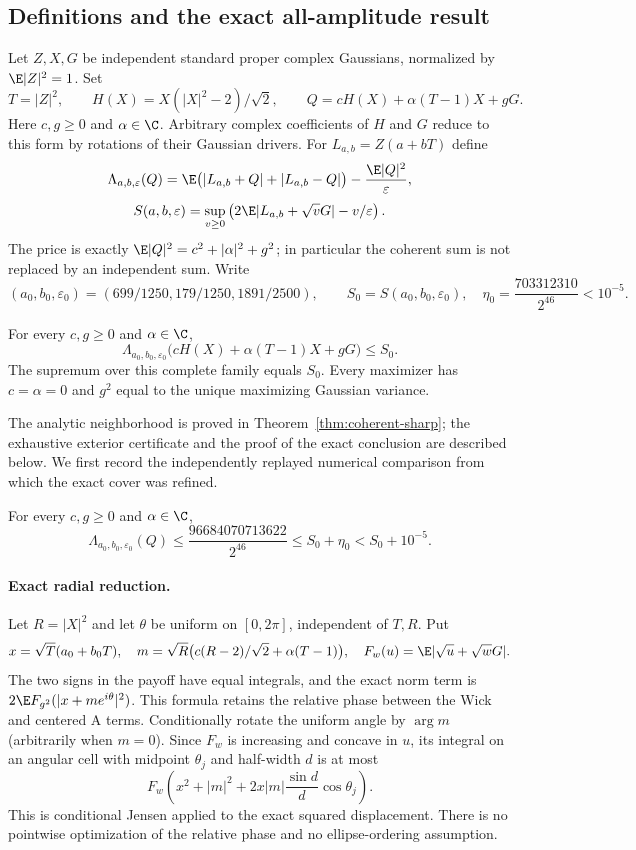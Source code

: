 \subsection{Definitions and the exact all-amplitude result}
Let $Z,X,G$ be independent standard proper complex Gaussians, normalized
by $\E|Z|^2=1$. Set
\[
 T=|Z|^2,\qquad H(X)=X(|X|^2-2)/\sqrt2,
 \qquad Q=cH(X)+\alpha(T-1)X+gG.
\]
Here $c,g\ge0$ and $\alpha\in\C$. Arbitrary complex coefficients of
$H$ and $G$ reduce to this form by rotations of their Gaussian drivers.
For $L_{a,b}=Z(a+bT)$ define
\[
 \Lambda_{a,b,\varepsilon}(Q)
 =\E\bigl(|L_{a,b}+Q|+|L_{a,b}-Q|\bigr)
    -\frac{\E|Q|^2}{\varepsilon},
\]
\[
 S(a,b,\varepsilon)
 =\sup_{v\ge0}\left(2\E|L_{a,b}+\sqrt vG|
                  -v/\varepsilon\right).
\]
The price is exactly
$\E|Q|^2=c^2+|\alpha|^2+g^2$; in particular the coherent sum is not
replaced by an independent sum. Write
\[
 (a_0,b_0,\varepsilon_0)
   =(699/1250,179/1250,1891/2500),\qquad
 S_0=S(a_0,b_0,\varepsilon_0),
 \quad \eta_0=\frac{703312310}{2^{46}}<10^{-5}.
\]

\begin{theorem}
\label{thm:coherent-a-exact}
For every $c,g\ge0$ and $\alpha\in\C$,
\[
 \boxed{\Lambda_{a_0,b_0,\varepsilon_0}
       \bigl(cH(X)+\alpha(T-1)X+gG\bigr)\le S_0.}
\]
The supremum over this complete family equals $S_0$. Every maximizer
has $c=\alpha=0$ and $g^2$ equal to the unique maximizing Gaussian
variance.
\end{theorem}
The analytic neighborhood is proved in
Theorem~\ref{thm:coherent-sharp}; the exhaustive exterior certificate
and the proof of the exact conclusion are described below. We first
record the independently replayed numerical comparison from which the
exact cover was refined.

\begin{theorem}
\label{thm:coherent-a-global}
For every $c,g\ge0$ and $\alpha\in\C$,
\[
 \Lambda_{a_0,b_0,\varepsilon_0}(Q)
 \le \frac{96684070713622}{2^{46}}
 \le S_0+\eta_0<S_0+10^{-5}.
\]
\end{theorem}

\paragraph{Exact radial reduction.}
Let $R=|X|^2$ and let $\theta$ be uniform on $[0,2\pi]$, independent
of $T,R$. Put
\[
 x=\sqrt T(a_0+b_0T),\quad
 m=\sqrt R\bigl(c(R-2)/\sqrt2+\alpha(T-1)\bigr),
 \quad F_w(u)=\E|\sqrt u+\sqrt wG|.
\]
The two signs in the payoff have equal integrals, and the exact norm
term is $2\E F_{g^2}(|x+me^{i\theta}|^2)$. This formula retains the
relative phase between the Wick and centered A terms. Conditionally
rotate the uniform angle by $\arg m$ (arbitrarily when $m=0$).
Since $F_w$ is
increasing and concave in $u$, its integral on an angular cell with
midpoint $\theta_j$ and half-width $d$ is at most
\[
 F_w\left(x^2+|m|^2+2x|m|\frac{\sin d}{d}\cos\theta_j\right).
\]
This is conditional Jensen applied to the exact squared displacement.
There is no pointwise optimization of the relative phase and no
ellipse-ordering assumption.

